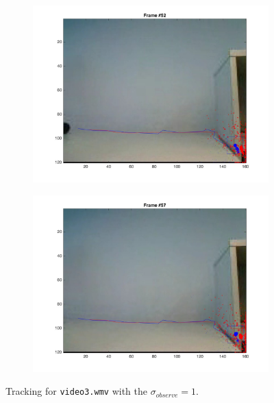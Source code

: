 \documentclass{ethz_report}
\begin{document}
\begin{figure}[h]
\begin{subfigure}[b]{.25\textwidth}
        \includegraphics[width=1\linewidth]{images/video3_observe_high_51}
    \end{subfigure}%
    \begin{subfigure}[b]{.25\textwidth}
        \centering
        \includegraphics[width=1\linewidth]{images/video3_observe_high_56}
    \end{subfigure}
    \caption{Tracking for \texttt{video3.wmv} with the $\sigma_{observe} = 1$.}
    \label{fig:tracking_video3_observe_high}
\end{figure}
\end{document}

